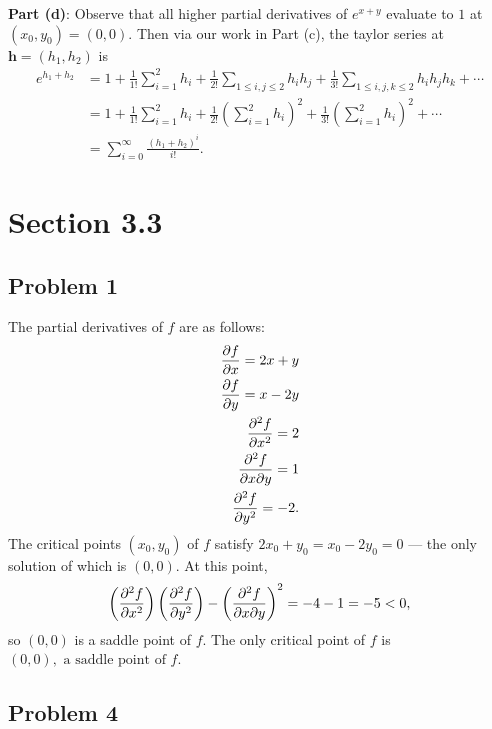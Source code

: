 \documentclass[11pt]{article}
\renewcommand{\vec}[1]{\mathbf{#1}}
\begin{document}
\textbf{Part (d)}: Observe that all higher partial derivatives of $e^{x + y}$ evaluate to $1$ at $(x_{0}, y_{0}) = (0, 0)$. Then via our work in Part (c), the taylor series at $\vec{h} = (h_{1}, h_{2})$ is
\begin{align*}
	e^{h_{1} + h_{2}} &= 1 + \frac{1}{1!} \sum_{i = 1}^{2} h_{i} + \frac{1}{2!} \sum_{1 \le i, j \le 2} h_{i} h_{j} + \frac{1}{3!} \sum_{1 \le i, j, k \le 2} h_{i} h_{j} h_{k} + \cdots \\
    &= 1 + \frac{1}{1!} \sum_{i = 1}^{2} h_{i} + \frac{1}{2!} \left( \sum_{i = 1}^{2} h_{i} \right)^{2} + \frac{1}{3!} \left( \sum_{i = 1}^{2} h_{i} \right)^{2} + \cdots \\
    &= \boxed{\sum_{i = 0}^{\infty} \frac{(h_{1} + h_{2})^{i}}{i!}}.
\end{align*}


\section{Section 3.3}


\subsection{Problem 1}

The partial derivatives of $f$ are as follows:
\begin{align*}
	\pdv{f}{x} = 2x + y \\ 
	\pdv{f}{y} = x - 2y \\
	\pdv[2]{f}{x} = 2 \\
	\pdv[2]{f}{x}{y} = 1 \\
	\pdv[2]{f}{y} = -2.
\end{align*}
The critical points $(x_{0}, y_{0})$ of $f$ satisfy $2x_{0} + y_{0} = x_{0} - 2y_{0} = 0$ --- the only solution of which is $(0, 0)$. At this point,
\[
	\left( \pdv[2]{f}{x} \right) \left( \pdv[2]{f}{y} \right) - \left( \pdv[2]{f}{x}{y} \right)^{2} = -4 - 1 = -5 < 0,
\]
so $(0, 0)$ is a saddle point of $f$. The only critical point of $f$ is $\boxed{(0, 0), \text{ a saddle point of }f}$.


\subsection{Problem 4}
\end{document}
